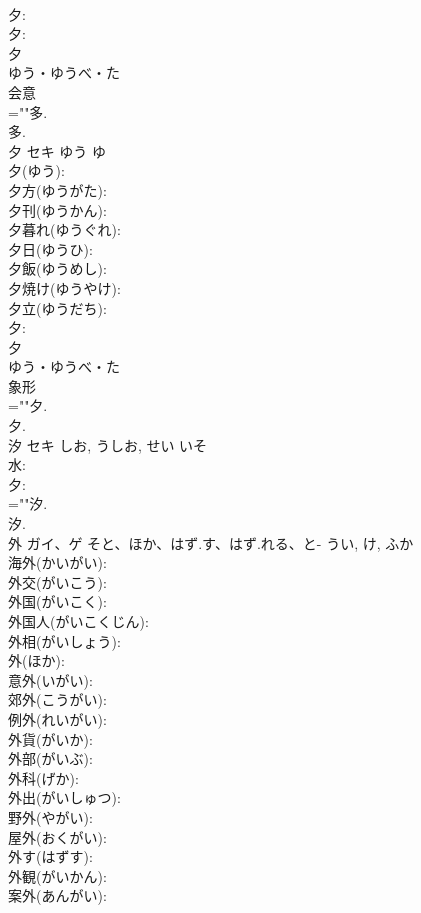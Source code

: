 \documentclass[8pt]{extreport}
\begin{document}
\begin{CJK}{UTF8}{min}
\\	夕: 
\\	夕: 
\\	夕	
\\	ゆう・ゆうべ・た	
\\	会意 
\\	=""多.
\\	多.
\\	夕	セキ	ゆう	ゆ	
\\	夕(ゆう): 
\\	夕方(ゆうがた): 
\\	夕刊(ゆうかん): 
\\	夕暮れ(ゆうぐれ): 
\\	夕日(ゆうひ): 
\\	夕飯(ゆうめし): 
\\	夕焼け(ゆうやけ): 
\\	夕立(ゆうだち): 
\\	夕: 
\\	夕	
\\	ゆう・ゆうべ・た	
\\	象形 
\\	=""夕.
\\	夕.
\\	汐	セキ	しお, うしお, せい	いそ	
\\	水: 
\\	夕: 
\\	=""汐.
\\	汐.
\\	外	ガイ、ゲ	そと、ほか、はず.す、はず.れる、と-	うい, け, ふか	
\\	海外(かいがい): 
\\	外交(がいこう): 
\\	外国(がいこく): 
\\	外国人(がいこくじん): 
\\	外相(がいしょう): 
\\	外(ほか): 
\\	意外(いがい): 
\\	郊外(こうがい): 
\\	例外(れいがい): 
\\	外貨(がいか): 
\\	外部(がいぶ): 
\\	外科(げか): 
\\	外出(がいしゅつ): 
\\	野外(やがい): 
\\	屋外(おくがい): 
\\	外す(はずす): 
\\	外観(がいかん): 
\\	案外(あんがい): 

\end{CJK}
\end{document}
